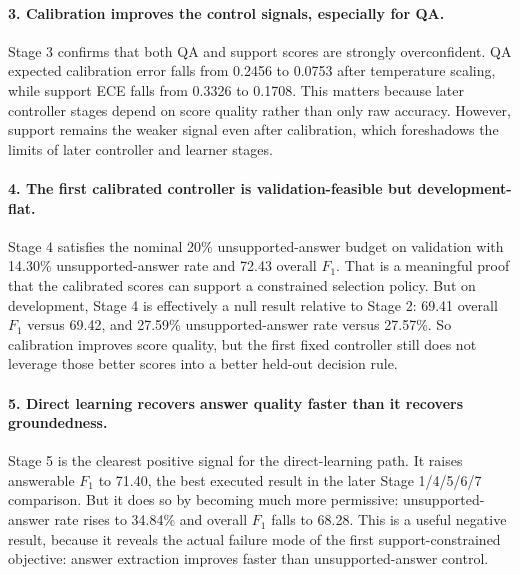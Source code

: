 \documentclass[10pt,twocolumn]{article}
\begin{document}
\paragraph{3. Calibration improves the control signals, especially for QA.}
Stage 3 confirms that both QA and support scores are strongly overconfident.
QA expected calibration error falls from 0.2456 to 0.0753 after temperature
scaling, while support ECE falls from 0.3326 to 0.1708.
This matters because later controller stages depend on score quality rather
than only raw accuracy.
However, support remains the weaker signal even after calibration, which
foreshadows the limits of later controller and learner stages.

\paragraph{4. The first calibrated controller is validation-feasible but
development-flat.}
Stage 4 satisfies the nominal 20\% unsupported-answer budget on validation with
14.30\% unsupported-answer rate and 72.43 overall \(F_1\).
That is a meaningful proof that the calibrated scores can support a constrained
selection policy.
But on development, Stage 4 is effectively a null result relative to Stage 2:
69.41 overall \(F_1\) versus 69.42, and 27.59\% unsupported-answer rate versus
27.57\%.
So calibration improves score quality, but the first fixed controller still
does not leverage those better scores into a better held-out decision rule.

\paragraph{5. Direct learning recovers answer quality faster than it recovers
groundedness.}
Stage 5 is the clearest positive signal for the direct-learning path.
It raises answerable \(F_1\) to 71.40, the best executed result in the later
Stage 1/4/5/6/7 comparison.
But it does so by becoming much more permissive:
unsupported-answer rate rises to 34.84\% and overall \(F_1\) falls to 68.28.
This is a useful negative result, because it reveals the actual failure mode of
the first support-constrained objective:
answer extraction improves faster than unsupported-answer control.
\end{document}
